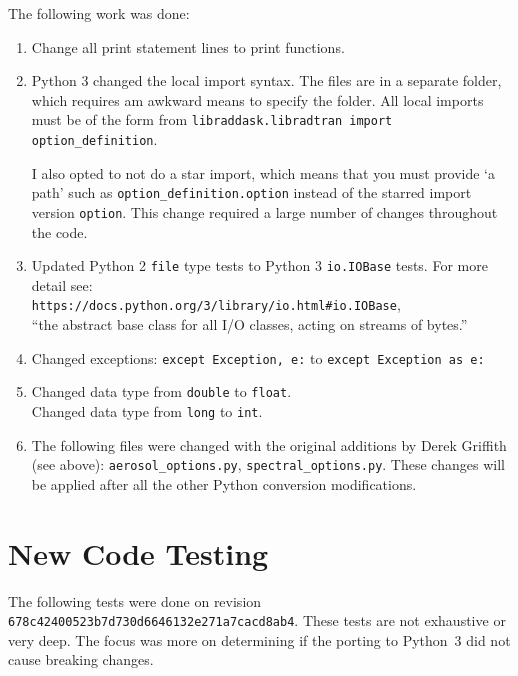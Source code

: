The following work was done:
\begin{enumerate}
\item Change all print statement lines to print functions.

\item Python 3 changed the local import syntax. The \libradtran{} files are in a separate folder, which requires am awkward means to specify the folder.
     All local imports must be of the form from \lstinline{libraddask.libradtran import option_definition}. 
     
     I also opted to not do a star import, which means that you must provide `a path' such as 
     \lstinline{option_definition.option} instead of the starred import version \lstinline{option}.  This change required a large number of changes throughout the code.

\item Updated Python 2 \lstinline{file} type tests to Python 3 \lstinline{io.IOBase} tests. For more detail see:\\
\lstinline{https://docs.python.org/3/library/io.html#io.IOBase},\\ ``the abstract base class for all I/O classes, acting on streams of bytes.''

\item
Changed exceptions:
\lstinline{except Exception, e:} to 
\lstinline{except Exception as e:}

\item 
Changed data type from \lstinline{double} to \lstinline{float}.\\
Changed data type from \lstinline{long} to \lstinline{int}.


\item 
The following files were changed with the original additions by Derek Griffith (see above):
\lstinline{aerosol_options.py}, \lstinline{spectral_options.py}.  These changes will be applied after all the other Python conversion modifications.


\end{enumerate}


\section{New Code Testing}

The following tests were done on revision 
\lstinline{678c42400523b7d730d6646132e271a7cacd8ab4}.
These tests are not exhaustive or very deep. The focus was more on determining if the porting to Python~3 did not cause breaking changes.

